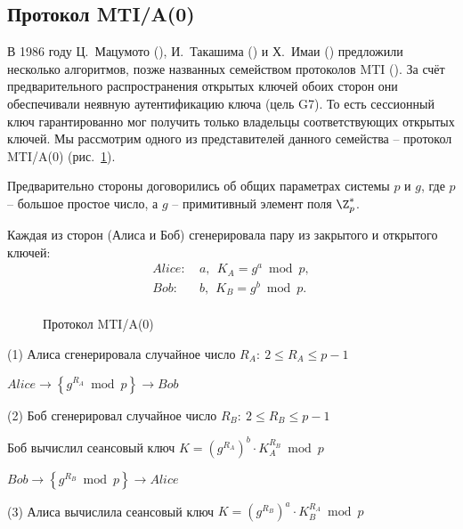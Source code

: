 \subsection{Протокол MTI/A(0)}\label{section-protocols-mti}

В 1986 году Ц.~Мацумото (), И.~Такашима () и Х.~Имаи () предложили несколько алгоритмов, позже названных семейством протоколов MTI (\cite{Matsumoto:Tsutomu:Imai:1986}). За счёт предварительного распространения открытых ключей обоих сторон они обеспечивали неявную аутентификацию ключа (цель G7). То есть сессионный ключ гарантированно мог получить только владельцы соответствующих открытых ключей. Мы рассмотрим одного из представителей данного семейства -- протокол MTI/A(0) (рис.~\ref{fig:key_distribution-mti}).

Предварительно стороны договорились об общих параметрах системы $p$ и $g$, где $p$ -- большое простое число, а $g$ -- примитивный элемент поля $\Z_p^*$.

Каждая из сторон (Алиса и Боб) сгенерировала пару из закрытого и открытого ключей:
\[\begin{array}{ll}
    Alice: & ~ a, ~~ K_A = g^a \bmod p, \\
    Bob: & ~ b, ~~ K_B = g^b \bmod p. \\
\end{array}\]

\begin{figure}
	\centering
	\begin{sequencediagram}

	\end{sequencediagram}
    \caption{Протокол MTI/A(0)\label{fig:key_distribution-mti}}
\end{figure}

\begin{protocol}
    \item[(1)] Алиса сгенерировала случайное число $R_A: ~ 2\leq R_A\leq p-1$
    \item[{}] $ Alice \to \left\{ g^{R_A} \bmod p \right\} \to Bob$
    \item[(2)] Боб сгенерировал случайное число $R_B: ~ 2\leq R_B\leq p-1$
    \item[{}] Боб вычислил сеансовый ключ $K = (g^{R_A})^b \cdot K_A^{R_B} \bmod p$
    \item[{}] $ Bob \to \left\{ g^{R_B} \bmod p \right\} \to Alice$
    \item[(3)] Алиса вычислила сеансовый ключ $K = (g^{R_B})^a \cdot K_B^{R_A} \bmod p$
\end{protocol}

